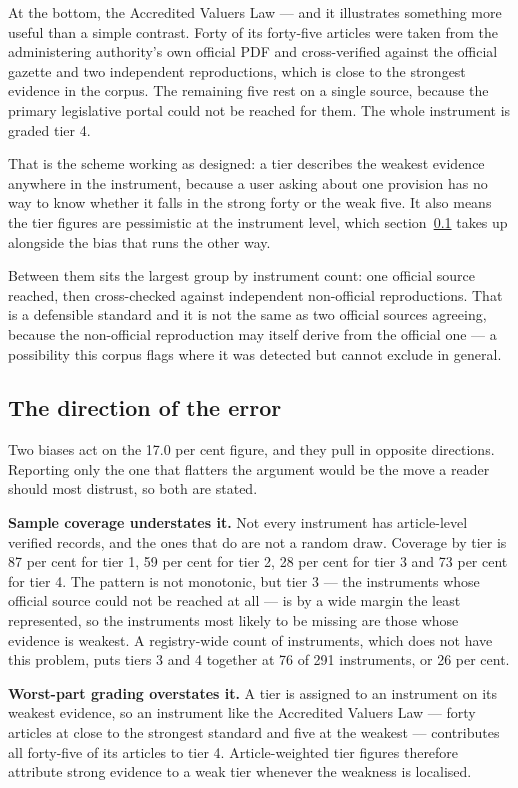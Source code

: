 \documentclass[11pt]{article}
\begin{document}
At the bottom, the Accredited Valuers Law --- and it illustrates something more
useful than a simple contrast. Forty of its forty-five articles were taken from
the administering authority's own official PDF and cross-verified against the
official gazette and two independent reproductions, which is close to the
strongest evidence in the corpus. The remaining five rest on a single source,
because the primary legislative portal could not be reached for them. The whole
instrument is graded tier 4.

That is the scheme working as designed: a tier describes the weakest evidence
anywhere in the instrument, because a user asking about one provision has no
way to know whether it falls in the strong forty or the weak five. It also
means the tier figures are pessimistic at the instrument level, which
section~\ref{sec:direction} takes up alongside the bias that runs the other
way.

Between them sits the largest group by instrument count: one official source
reached, then cross-checked against independent non-official reproductions.
That is a defensible standard and it is not the same as two official sources
agreeing, because the non-official reproduction may itself derive from the
official one --- a possibility this corpus flags where it was detected but
cannot exclude in general.

\subsection{The direction of the error}
\label{sec:direction}

Two biases act on the 17.0 per cent figure, and they pull in opposite
directions. Reporting only the one that flatters the argument would be the
move a reader should most distrust, so both are stated.

\textbf{Sample coverage understates it.} Not every instrument has article-level
verified records, and the ones that do are not a random draw. Coverage by tier
is 87 per cent for tier 1, 59 per cent for tier 2, 28 per cent for tier 3 and 73
per cent for tier 4. The pattern is not monotonic, but tier 3 --- the
instruments whose official source could not be reached at all --- is by a wide
margin the least represented, so the instruments most likely to be missing are
those whose evidence is weakest. A registry-wide count of instruments, which
does not have this problem, puts tiers 3 and 4 together at 76 of 291
instruments, or 26 per cent.

\textbf{Worst-part grading overstates it.} A tier is assigned to an instrument
on its weakest evidence, so an instrument like the Accredited Valuers Law ---
forty articles at close to the strongest standard and five at the weakest ---
contributes all forty-five of its articles to tier 4. Article-weighted tier
figures therefore attribute strong evidence to a weak tier whenever the
weakness is localised.
\end{document}
